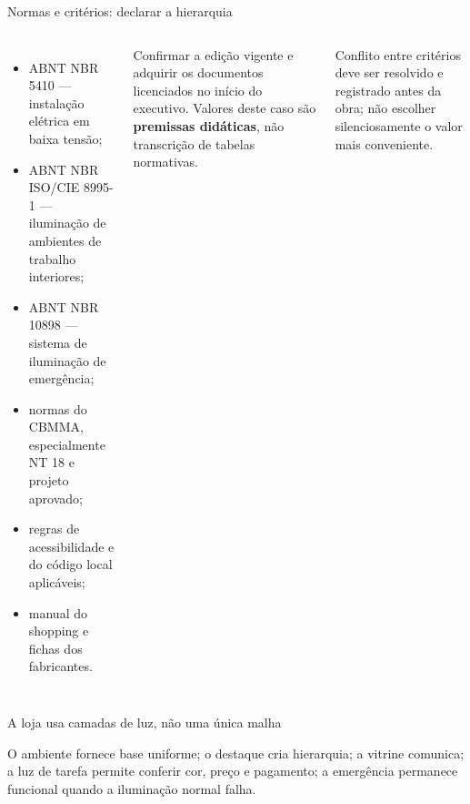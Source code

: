 \begin{frame}{Normas e critérios: declarar a hierarquia}
\small
\begin{columns}[T,onlytextwidth]
\begin{itemize}
\item ABNT NBR 5410 — instalação elétrica em baixa tensão;
\item ABNT NBR ISO/CIE 8995-1 — iluminação de ambientes de trabalho interiores;
\item ABNT NBR 10898 — sistema de iluminação de emergência;
\item normas do CBMMA, especialmente NT 18 e projeto aprovado;
\item regras de acessibilidade e do código local aplicáveis;
\item manual do shopping e fichas dos fabricantes.
\end{itemize}
\begin{caixaNorma}[title=Regra de uso]
Confirmar a edição vigente e adquirir os documentos licenciados no início do executivo. Valores deste caso são \textbf{premissas didáticas}, não transcrição de tabelas normativas.
\end{caixaNorma}
\begin{caixaAt}
Conflito entre critérios deve ser resolvido e registrado antes da obra; não escolher silenciosamente o valor mais conveniente.
\end{caixaAt}
\end{columns}
\end{frame}

\begin{frame}{A loja usa camadas de luz, não uma única malha}
\centering
{}
\vspace{4mm}
\begin{caixaObs}
O ambiente fornece base uniforme; o destaque cria hierarquia; a vitrine comunica; a luz de tarefa permite conferir cor, preço e pagamento; a emergência permanece funcional quando a iluminação normal falha.
\end{caixaObs}
\end{frame}

